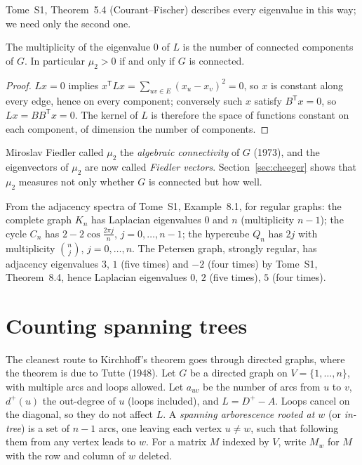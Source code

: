 Tome~S1, Theorem~5.4 (Courant--Fischer) describes every eigenvalue in this way; we need only the second one.

\begin{proposition}\label{prop:components}
The multiplicity of the eigenvalue $0$ of $L$ is the number of connected components of $G$. In particular $\mu_2>0$ if and only if $G$ is connected.
\end{proposition}
\begin{proof}
$Lx=0$ implies $x^{\mathsf T}Lx=\sum_{uv\in E}(x_u-x_v)^2=0$, so $x$ is constant along every edge, hence on every component; conversely such $x$ satisfy $B^{\mathsf T}x=0$,
so $Lx=BB^{\mathsf T}x=0$. The kernel of $L$ is therefore the space of functions constant on each component, of dimension the number of components.
\end{proof}

Miroslav Fiedler called $\mu_2$ the \emph{algebraic connectivity} of $G$ (1973), and the eigenvectors of $\mu_2$ are now called \emph{Fiedler vectors}.
Section~\ref{sec:cheeger} shows that $\mu_2$ measures not only whether $G$ is connected but how well.

\begin{example}\label{ex:lapspectra}
From the adjacency spectra of Tome~S1, Example~8.1, for regular graphs: the complete graph $K_n$ has Laplacian eigenvalues $0$ and $n$ (multiplicity $n-1$);
the cycle $C_n$ has $2-2\cos\frac{2\pi j}n$, $j=0,\dots,n-1$; the hypercube $Q_n$ has $2j$ with multiplicity $\binom nj$, $j=0,\dots,n$. The Petersen graph, strongly regular,
has adjacency eigenvalues $3$, $1$ (five times) and $-2$ (four times) by Tome~S1, Theorem~8.4, hence Laplacian eigenvalues $0$, $2$ (five times), $5$ (four times).
\end{example}

\section{Counting spanning trees}

The cleanest route to Kirchhoff's theorem goes through directed graphs, where the theorem is due to Tutte (1948). Let $G$ be a directed graph on
$V=\{1,\dots,n\}$, with multiple arcs and loops allowed. Let $a_{uv}$ be the number of arcs from $u$ to $v$, $d^+(u)$ the out-degree of $u$ (loops
included), and $L=D^+-A$. Loops cancel on the diagonal, so they do not affect $L$. A \emph{spanning arborescence rooted at $w$} (or \emph{in-tree}) is a set of
$n-1$ arcs, one leaving each vertex $u\ne w$, such that following them from any vertex leads to $w$. For a matrix $M$ indexed by $V$, write $M_w$ for $M$ with the row
and column of $w$ deleted.

